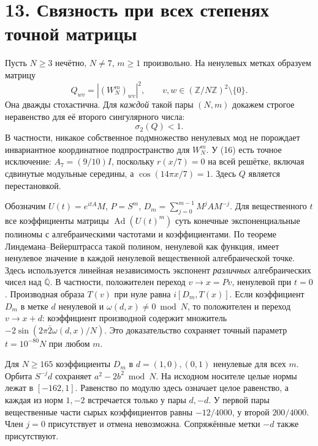 \documentclass[11pt,a4paper]{article}
\newcommand{\Z}{\mathbb Z}
\newcommand{\sect}[1]{\section*{\sffamily\color{ink}#1}}
\begin{document}
\newpage
\sect{13. Связность при всех степенях точной матрицы}
Пусть $N\ge3$ нечётно, $N\ne7$, $m\ge1$ произвольно. На ненулевых метках образуем матрицу
\[
 Q_{wv}=|(W_N^m)_{wv}|^2,\qquad v,w\in(\Z/N\Z)^2\setminus\{0\}.
\]
Она дважды стохастична. Для \emph{каждой} такой пары $(N,m)$ докажем строгое неравенство для её второго сингулярного числа:
\[
                        \boxed{\sigma_2(Q)<1.}                            \tag{16}
\]
В частности, никакое собственное подмножество ненулевых мод не порождает инвариантное координатное подпространство для $W_N^m$. У (16) есть точное исключение: $A_7=(9/10)I$, поскольку $r(x/7)=0$ на всей решётке, включая сдвинутые модульные середины, а $\cos(14\pi x/7)=1$. Здесь $Q$ является перестановкой.

Обозначим $U(t)=e^{itA}M$, $P=S^m$, $D_m=\sum_{j=0}^{m-1}M^jAM^{-j}$. Для вещественного $t$ все коэффициенты матрицы $\operatorname{Ad}(U(t)^m)$ суть конечные экспоненциальные полиномы с алгебраическими частотами и коэффициентами. По теореме Линдемана--Вейерштрасса такой полином, ненулевой как функция, имеет ненулевое значение в каждой ненулевой вещественной алгебраической точке. Здесь используется линейная независимость экспонент \emph{различных} алгебраических чисел над $\overline{\mathbb Q}$. В частности, положителен переход $v\to x=Pv$, ненулевой при $t=0$. Производная образа $T(v)$ при нуле равна $i[D_m,T(x)]$. Если коэффициент $D_m$ в метке $d$ ненулевой и $\omega(d,x)\ne0\bmod N$, то положителен и переход $v\to x+d$: коэффициент производной содержит множитель $-2\sin(2\pi\bar2\omega(d,x)/N)$. Это доказательство сохраняет точный параметр $t=10^{-80}N$ при любом $m$.

Для $N\ge165$ коэффициенты $D_m$ в $d=(1,0),(0,1)$ ненулевые для всех $m$. Орбита $S^{-j}d$ сохраняет $a^2-2b^2\bmod N$. На исходном носителе целые нормы лежат в $[-162,1]$. Равенство по модулю здесь означает целое равенство, а каждая из норм $1,-2$ встречается только у пары $d,-d$. У первой пары вещественные части сырых коэффициентов равны $-12/4000$, у второй $200/4000$. Член $j=0$ присутствует и отмена невозможна. Сопряжённые метки $-d$ также присутствуют.
\end{document}

